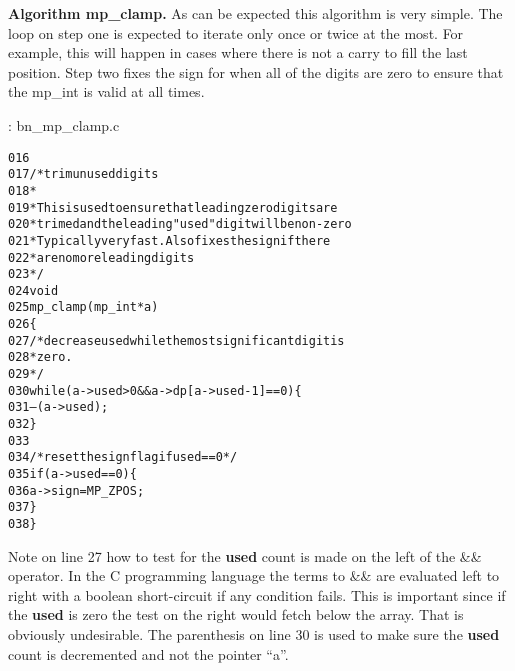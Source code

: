 \documentclass[b5paper]{book}
\begin{document}
\textbf{Algorithm mp\_clamp.}
As can be expected this algorithm is very simple.  The loop on step one is expected to iterate only once or twice at
the most.  For example, this will happen in cases where there is not a carry to fill the last position.  Step two fixes the sign for 
when all of the digits are zero to ensure that the mp\_int is valid at all times.

\vspace{+3mm}\begin{small}
\hspace{-5.1mm}{\bf File}: bn\_mp\_clamp.c
\vspace{-3mm}
\begin{alltt}
016   
017   /* trim unused digits 
018    *
019    * This is used to ensure that leading zero digits are
020    * trimed and the leading "used" digit will be non-zero
021    * Typically very fast.  Also fixes the sign if there
022    * are no more leading digits
023    */
024   void
025   mp_clamp (mp_int * a)
026   \{
027     /* decrease used while the most significant digit is
028      * zero.
029      */
030     while (a->used > 0 && a->dp[a->used - 1] == 0) \{
031       --(a->used);
032     \}
033   
034     /* reset the sign flag if used == 0 */
035     if (a->used == 0) \{
036       a->sign = MP_ZPOS;
037     \}
038   \}
\end{alltt}
\end{small}

Note on line 27 how to test for the \textbf{used} count is made on the left of the \&\& operator.  In the C programming
language the terms to \&\& are evaluated left to right with a boolean short-circuit if any condition fails.  This is 
important since if the \textbf{used} is zero the test on the right would fetch below the array.  That is obviously 
undesirable.  The parenthesis on line 30 is used to make sure the \textbf{used} count is decremented and not
the pointer ``a''.  
\end{document}
